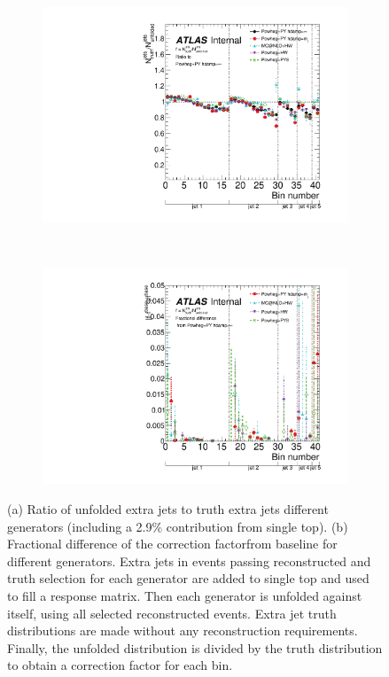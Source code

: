 \begin{center}
\begin{figure}
\begin{subfigure}[]{0.45\textwidth}
\includegraphics[width=\textwidth]{fig/Unfolding/CorrFactors.pdf}
\end{subfigure}
~
\begin{subfigure}[]{0.45\textwidth}
\includegraphics[width=\textwidth]{fig/Unfolding/FractionCorrectionDiff.pdf}
\end{subfigure}
\caption{(a) Ratio of unfolded extra jets to truth extra jets different \ttbar generators (including a 2.9\% contribution from single top). (b) Fractional difference of the correction factorfrom baseline for different generators. Extra jets in events passing reconstructed and truth selection for each generator are added to single top and used to fill a response matrix. Then each generator is unfolded against itself, using all selected reconstructed events. Extra jet truth distributions are made without any reconstruction requirements. Finally, the unfolded distribution is divided by the truth distribution to obtain a correction factor for each bin.
\label{fig:bincorr}}
\end{figure}
\end{center}




